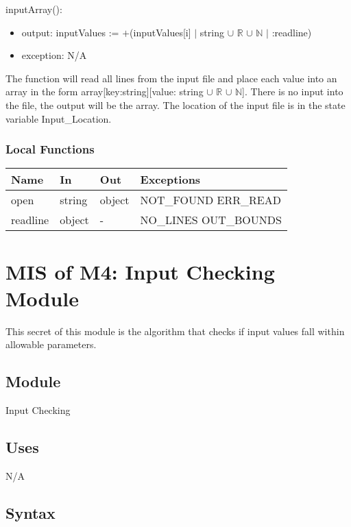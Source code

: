 \documentclass[12pt, titlepage]{article}
\begin{document}
\noindent inputArray():
\begin{itemize}
	\item output: inputValues := $+$(inputValues[i] $|$ string $\cup$ $\mathbb{R}$ $\cup$ $\mathbb{N}$ $|$ :readline)
	\item exception: N/A
\end{itemize}

The function will read all lines from the input file and place each value into an array in the form array[key:string][value: string $\cup$ $\mathbb{R}$ $\cup$ $\mathbb{N}$]. There is no input into the file, the output will be the array. The location of the input file is in the state variable Input\_Location.

\subsubsection{Local Functions}

\begin{center}
	\begin{tabular}{p{2cm} p{4cm} p{4cm} p{2cm}}
		\hline
		\textbf{Name} & \textbf{In} & \textbf{Out} & \textbf{Exceptions} \\
		\hline
		open & string & object & NOT\_FOUND ERR\_READ\\
		readline & object & - & NO\_LINES OUT\_BOUNDS\\
		\hline
	\end{tabular}
\end{center}

\newpage

\section{MIS of M4: Input Checking Module} \label{ICModule} 

This secret of this module is the algorithm that checks if input values fall within allowable parameters.

\subsection{Module}

Input Checking

\subsection{Uses}
N/A

\subsection{Syntax}
\end{document}
